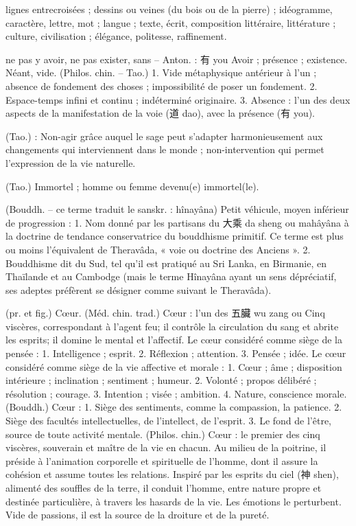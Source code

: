 \begin{Def}[wen 文]
    lignes entrecroisées ; dessins ou veines (du bois ou de la pierre) ; idéogramme, caractère, lettre, mot ; langue ; texte, écrit, composition littéraire, littérature ; culture, civilisation ; élégance, politesse, raffinement. 
\end{Def}
\begin{Def}[wu無 ]
    ne pas y avoir, ne pas exister, sans – Anton. : 有 you Avoir ; présence ; existence. Néant, vide. (Philos. chin. – Tao.) 1. Vide métaphysique antérieur à l’un ; absence de fondement des choses ; impossibilité de poser un fondement. 2. Espace-temps infini et continu ; indéterminé originaire. 3. Absence : l’un des deux aspects de la manifestation de la voie (道 dao), avec la présence (有 you).
\end{Def}
\begin{Def}[wuwei 無為]
    (Tao.) : Non-agir grâce auquel le sage peut s’adapter harmonieusement aux changements qui interviennent dans le monde ; non-intervention qui permet l’expression de la vie naturelle.
\end{Def}
\begin{Def}[xian仙]
    (Tao.) Immortel ; homme ou femme devenu(e) immortel(le). 
\end{Def}
\begin{Def}[xiaosheng 小乘]
    (Bouddh. – ce terme traduit le sanskr. : hînayâna) Petit véhicule, moyen inférieur de progression :	1. Nom donné par les partisans du 大乘 da sheng ou mahâyâna à la doctrine de tendance conservatrice du bouddhisme primitif. Ce terme est plus ou moins l’équivalent de Theravâda, « voie ou doctrine des Anciens ». 2. Bouddhisme dit du Sud, tel qu’il est pratiqué au Sri Lanka, en Birmanie, en Thaïlande et au Cambodge (mais le terme Hînayâna ayant un sens dépréciatif, ses adeptes préfèrent se désigner comme suivant le Theravâda).
\end{Def}
\begin{Def}[xin 心]
    (pr. et fig.) Cœur.	    (Méd. chin. trad.) Cœur : l’un des 五臟 wu zang ou Cinq viscères, correspondant à l’agent feu; il contrôle la circulation du sang et abrite les esprits; il domine le mental et l’affectif. Le cœur considéré comme siège de la pensée : 1. Intelligence ; esprit. 2. Réflexion ; attention. 3. Pensée ; idée. Le cœur considéré comme siège de la vie affective et morale : 1. Cœur ; âme ; disposition intérieure ; inclination ; sentiment ; humeur. 2. Volonté ; propos délibéré ; résolution ; courage. 3. Intention ; visée ; ambition. 4. Nature, conscience morale. (Bouddh.) Cœur : 1. Siège des sentiments, comme la compassion, la patience. 2. Siège des facultés intellectuelles, de l’intellect, de l’esprit. 3. Le fond de l’être, source de toute activité mentale.  (Philos. chin.) Cœur : le premier des cinq viscères, souverain et maître de la vie en chacun. Au milieu de la poitrine, il préside à l’animation corporelle et spirituelle de l’homme, dont il assure la cohésion et assume toutes les relations. Inspiré par les esprits du ciel (神 shen), alimenté des souffles de la terre, il conduit l’homme, entre nature propre et destinée particulière, à travers les hasards de la vie. Les émotions le perturbent. Vide de passions, il est la source de la droiture et de la pureté.
\end{Def}

